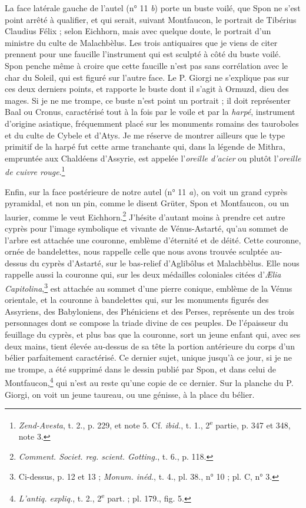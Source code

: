 \documentclass[a4paper, 11pt, oneside, polutonikogreek, french]{article}
\begin{document}
La face latérale gauche de l'autel (n° 11 \emph{b}) porte un buste voilé, que Spon ne s'est point arrêté à qualifier, et qui serait, suivant Montfaucon, le portrait de Tibérius Claudius Félix ; selon Eichhorn, mais avec quelque doute, le portrait d'un ministre du culte de Malachbèlus. Les trois antiquaires que je viens de citer prennent pour une faucille l'instrument qui est sculpté à côté du buste voilé. Spon penche même à croire que cette faucille n'est pas sans corrélation avec le char du Soleil, qui est figuré sur l'autre face. Le P. Giorgi ne s'explique pas sur ces deux derniers points, et rapporte le buste dont il s'agit à Ormuzd, dieu des mages. Si je ne me trompe, ce buste n'est point un portrait ; il doit représenter Baal ou Cronus, caractérisé tout à la fois par le voile et par la \emph{harpé}, instrument d'origine asiatique, fréquemment placé sur les monuments romains des tauroboles et du culte de Cybele et d'Atys. Je me réserve de montrer ailleurs que le type primitif de la harpé fut cette arme tranchante qui, dans la légende de Mithra, empruntée aux Chaldéens d'Assyrie, est appelée l'\emph{oreille d'acier} ou plutôt l'\emph{oreille de cuivre rouge}.\footnote{\emph{Zend-Avesta}, t. 2., p. 229, et note 5. Cf. \emph{ibid.}, t. 1., 2\textsuperscript{e} partie, p. 347 et 348, note 3.}

Enfin, sur la face postérieure de notre autel (n° 11 \emph{a}), on voit un grand cyprès pyramidal, et non un pin, comme le disent Grüter, Spon et Montfaucon, ou un laurier, comme le veut Eichhorn.\footnote{\emph{Comment. Societ. reg. scient. Gotting.}, t. 6., p. 118.} J'hésite d'autant moins à prendre cet autre cyprès pour l'image symbolique et vivante de Vénus-Astarté, qu'au sommet de l'arbre est attachée une couronne, emblème d'éternité et de déité. Cette couronne, ornée de bandelettes, nous rappelle celle que nous avons trouvée sculptée au-dessus du cyprès d'Astarté, sur le bas-relief d'Aglibôlus et Malachbèlus. Elle nous rappelle aussi la couronne qui, sur les deux médailles coloniales citées d'\emph{Ælia Capitolina},\footnote{Ci-dessus, p. 12 et 13 ; \emph{Monum. inéd.}, t. 4., pl. 38., n° 10 ; pl. C, n° 3.} est attachée au sommet d'une pierre conique, emblème de la Vénus orientale, et la couronne à bandelettes qui, sur les monuments figurés des Assyriens, des Babyloniens, des Phéniciens et des Perses, représente un des trois personnages dont se compose la triade divine de ces peuples. De l'épaisseur du feuillage du cyprès, et plus bas que la couronne, sort un jeune enfant qui, avec ses deux mains, tient élevée au-dessus de sa tête la portion antérieure du corps d'un bélier parfaitement caractérisé. Ce dernier sujet, unique jusqu'à ce jour, si je ne me trompe, a été supprimé dans le dessin publié par Spon, et dans celui de Montfaucon,\footnote{\emph{L'antiq. expliq.}, t. 2., 2\textsuperscript{e} part. ; pl. 179., fig. 5.} qui n'est au reste qu'une copie de ce dernier. Sur la planche du P. Giorgi, on voit un jeune taureau, ou une génisse, à la place du bélier.
\end{document}
